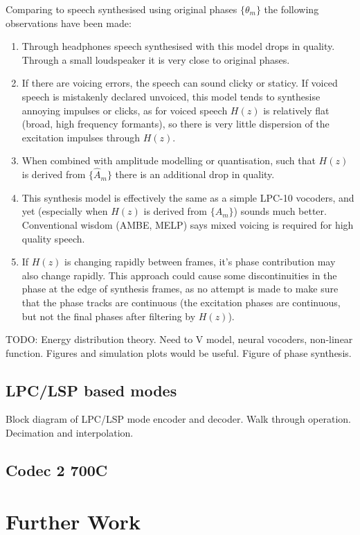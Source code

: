\documentclass{article}
\begin{document}
Comparing to speech synthesised using original phases $\{\theta_m\}$ the following observations have been made:
\begin{enumerate}
\item Through headphones speech synthesised with this model drops in quality. Through a small loudspeaker it is very close to original phases.
\item If there are voicing errors, the speech can sound clicky or staticy.  If voiced speech is mistakenly declared unvoiced, this model tends to synthesise annoying impulses or clicks, as for voiced speech $H(z)$ is relatively flat (broad, high frequency formants), so there is very little dispersion of the excitation impulses through $H(z)$.
\item When combined with amplitude modelling or quantisation, such that $H(z)$ is derived from $\{\hat{A}_m\}$ there is an additional drop in quality.
\item This synthesis model is effectively the same as a simple LPC-10 vocoders, and yet (especially when $H(z)$ is derived from $\{A_m\}$) sounds much better.  Conventional wisdom (AMBE, MELP) says mixed voicing is required for high quality speech.
\item If $H(z)$ is changing rapidly between frames, it's phase contribution may also change rapidly. This approach could cause some discontinuities in the phase at the edge of synthesis frames, as no attempt is made to make sure that the phase tracks are continuous (the excitation phases are continuous, but not the final phases after filtering by $H(z)$).
\end{enumerate}

TODO: Energy distribution theory.  Need to V model, neural vocoders, non-linear function. Figures and simulation plots would be useful. Figure of phase synthesis.

\subsection{LPC/LSP based modes}
\label{sect:mode_lpc_lsp}

Block diagram of LPC/LSP mode encoder and decoder.  Walk through operation.  Decimation and interpolation.

\subsection{Codec 2 700C}
\label{sect:mode_newamp1}

\section{Further Work}
\end{document}
